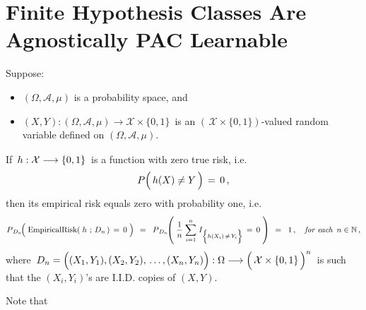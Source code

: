 

\section{Finite Hypothesis Classes Are Agnostically PAC Learnable}
\setcounter{theorem}{0}
\setcounter{equation}{0}


\renewcommand{\theenumi}{\roman{enumi}}
\renewcommand{\labelenumi}{\textnormal{(\theenumi)}$\;\;$}


\begin{lemma}
\mbox{}\vskip 0.1cm
\noindent
Suppose:
\begin{itemize}
\item
	$(\Omega,\mathcal{A},\mu)$ is a probability space, and
\item
	$(X,Y) : (\Omega,\mathcal{A},\mu) \longrightarrow \mathcal{X}\times\{0,1\}$\,
	is an $\left(\,\mathcal{X}\times\{0,1\}\right)$-valued random variable
	defined on $(\Omega,\mathcal{A},\mu)$.
\end{itemize}
If \,$h : \mathcal{X} \overset{{\color{white}-}}{\longrightarrow} \{0,1\}$\,
is a function with zero true risk, i.e.
\begin{equation*}
P\!\left(\,h(X) \overset{{\color{white}.}}{\neq} Y \,\right) \,=\, 0\,,
\end{equation*}
then its empirical risk equals zero with probability one, i.e.
\begin{equation*}
P_{\,D_{n}}\!\!\left(\;
	\textnormal{EmpiricalRisk}(\;h\,\overset{{\color{white}-}}{;}\,D_{n}\,) \,=\, 0
	\;\right)
\;\, = \;\;
P_{\,D_{n}}\!\!\left(\;
	\dfrac{1}{n}\;\overset{n}{\underset{i=1}{\sum}}\;
	I_{\left\{h(X_{i}) \,\overset{{\color{white}.}}{\neq}\, Y_{i}\right\}} \,=\, 0
	\;\right)
\;\, = \;\;
	1\,,
\quad
\textit{for each \,$n\in\N$}\,,
\end{equation*}
where
\,$D_{n} = \left((X_{1},Y_{1}),(X_{2},Y_{2}),\,\overset{{\color{white}\vert}}{\ldots}\,,(X_{n},Y_{n})\right)
	: \Omega \longrightarrow
	\left(\,\mathcal{X}\overset{{\color{white}.}}{\times}\{0,1\}\,\right)^{n}$\,
is such that the $(X_{i},Y_{i})$'s are I.I.D. copies of $(X,Y)$.
\end{lemma}
\proof
Note that
